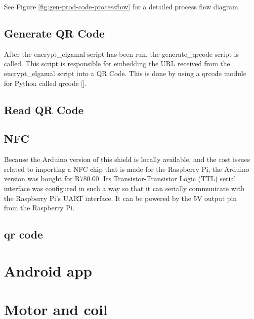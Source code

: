 See Figure \ref{fig:gen-prod-code-processflow} for a detailed process flow
diagram.

\subsection{Generate QR Code}
\label{sec:gen-qrcode}

After the encrypt\_elgamal script has been run, the generate\_qrcode script is
called. This script is responsible for embedding the URL received from the
encrypt\_elgamal script into a QR Code. This is done by using a qrcode module
for Python called qrcode [\cite{website:qrcode-generator}].

\subsection{Read QR Code}

\subsection{NFC}

Because the Arduino version of this shield is locally available, and the cost issues related
to importing a NFC chip that is made for the Raspberry Pi, the Arduino version was bought for 
R780.00. Its Transistor-Transistor Logic (TTL) serial interface was configured in such a way
so that it can serially communicate with the Raspberry Pi's UART interface. It can be powered
by the 5V output pin from the Raspberry Pi. 

\subsection{qr code}

\section{Android app}
\label{sec:nfc-android-app}

\section{Motor and coil}
\label{sec:detail-switch}